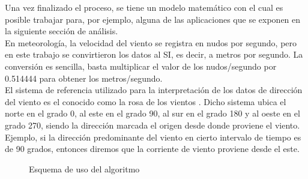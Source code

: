 Una vez finalizado el proceso, se tiene un modelo matemático con el cual es posible trabajar para, por ejemplo, alguna de las aplicaciones que se exponen en la siguiente sección de análisis.\\
En meteorología, la velocidad del viento se registra en nudos por segundo, pero en este trabajo se convirtieron los datos al SI, es decir, a metros por segundo. La conversión es sencilla, basta multiplicar el valor de los nudos/segundo por 0.514444 para obtener los metros/segundo.\\
El sistema de referencia utilizado para la interpretación de los datos de dirección del viento es el conocido como la rosa de los vientos \cite{RosaViento}. Dicho sistema ubica el norte en el grado 0, al este en el grado 90, al sur en el grado 180 y al oeste en el grado 270, siendo la dirección marcada el origen desde donde proviene el viento. Ejemplo, si la dirección predominante del viento en cierto intervalo de tiempo es de 90 grados, entonces diremos que la corriente de viento proviene desde el este.

\begin{figure}[ht!]
\caption{Esquema de uso del algoritmo}

\label{esq:PSO_ALG}
\end{figure}